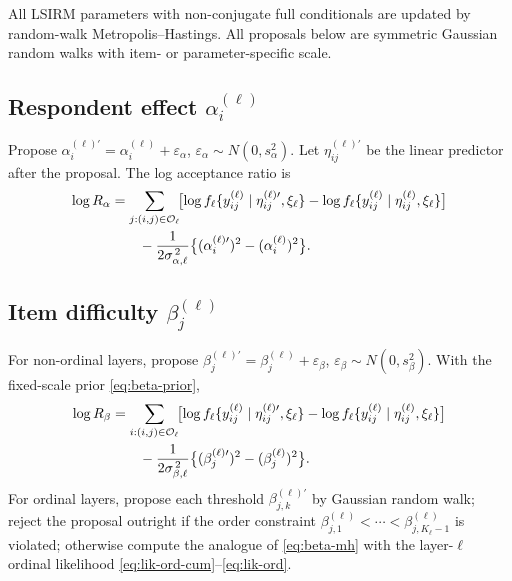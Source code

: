 \documentclass[11pt]{article}
\begin{document}
All LSIRM parameters with non-conjugate full conditionals are updated by
random-walk Metropolis--Hastings.  All proposals below are symmetric
Gaussian random walks with item- or parameter-specific scale.

\subsection{Respondent effect $\alpha_i^{(\ell)}$}

Propose
$\alpha_i^{(\ell)\prime}=\alpha_i^{(\ell)}+\varepsilon_\alpha$,
$\varepsilon_\alpha\sim N(0,s_\alpha^2)$.  Let
$\eta_{ij}^{(\ell)\prime}$ be the linear predictor after the proposal.
The log acceptance ratio is
\begin{align}
    \log R_\alpha
    &=
    \sum_{j:(i,j)\in\mathcal O_\ell}
    \!\bigl[\log f_\ell\{y_{ij}^{(\ell)}\mid\eta_{ij}^{(\ell)\prime},\xi_\ell\}
        -\log f_\ell\{y_{ij}^{(\ell)}\mid\eta_{ij}^{(\ell)},\xi_\ell\}\bigr]
    \notag\\
    &\qquad
    -\frac{1}{2\sigma_{\alpha,\ell}^{\,2}}
    \bigl\{(\alpha_i^{(\ell)\prime})^2-(\alpha_i^{(\ell)})^2\bigr\}.
    \label{eq:alpha-mh}
\end{align}

\subsection{Item difficulty $\beta_j^{(\ell)}$}

For non-ordinal layers, propose
$\beta_j^{(\ell)\prime}=\beta_j^{(\ell)}+\varepsilon_\beta$,
$\varepsilon_\beta\sim N(0,s_\beta^2)$.  With the fixed-scale prior
\eqref{eq:beta-prior},
\begin{align}
    \log R_\beta
    &=
    \sum_{i:(i,j)\in\mathcal O_\ell}
    \!\bigl[\log f_\ell\{y_{ij}^{(\ell)}\mid\eta_{ij}^{(\ell)\prime},\xi_\ell\}
        -\log f_\ell\{y_{ij}^{(\ell)}\mid\eta_{ij}^{(\ell)},\xi_\ell\}\bigr]
    \notag\\
    &\qquad
    -\frac{1}{2\sigma_{\beta,\ell}^{\,2}}
    \bigl\{(\beta_j^{(\ell)\prime})^2-(\beta_j^{(\ell)})^2\bigr\}.
    \label{eq:beta-mh}
\end{align}
For ordinal layers, propose each threshold $\beta_{j,k}^{(\ell)\prime}$
by Gaussian random walk; reject the proposal outright if the order
constraint $\beta_{j,1}^{(\ell)}<\cdots<\beta_{j,K_\ell-1}^{(\ell)}$ is
violated; otherwise compute the analogue of \eqref{eq:beta-mh} with the
layer-$\ell$ ordinal likelihood
\eqref{eq:lik-ord-cum}--\eqref{eq:lik-ord}.
\end{document}
